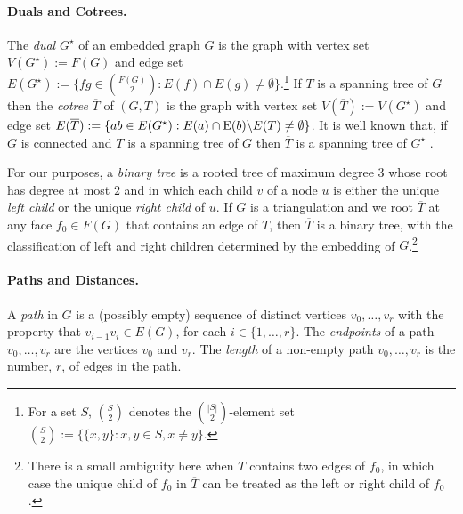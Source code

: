 \documentclass{patmorin}
\DeclareMathOperator{\dist}{dist}
\begin{document}
\paragraph*{Duals and Cotrees.}

The \emph{dual} $G^\star$ of an embedded graph $G$ is the graph with vertex set $V(G^\star):=F(G)$ and edge set $E(G^{\star}):=\{fg\in \binom{F(G)}{2}:E(f)\cap E(g)\neq\emptyset\}$.\footnote{For a set $S$, $\binom{S}{2}$ denotes the $\binom{|S|}{2}$-element set $\binom{S}{2}:=\{\{x,y\}:x,y\in S, x\neq y\}$.} If $T$ is a spanning tree of $G$ then the \emph{cotree} $\overline{T}$ of $(G,T)$ is the graph with vertex set $V(\overline{T}) := V(G^\star)$ and edge set $E(\overline{T}) := \{ab \in E(G^\star) : E(a) \cap \mathrm{E}(b) \backslash E(T) \neq \emptyset \}$. It is well known that, if $G$ is connected and $T$ is a spanning tree of $G$ then $\overline{T}$ is a spanning tree of $G^\star$ \cite[Chapter~4, Exercise~42]{diestel:graph}.

For our purposes, a \emph{binary tree} is a rooted tree of maximum degree $3$ whose root has degree at most $2$ and in which each child $v$ of a node $u$ is either the unique \emph{left child} or the unique \emph{right child} of $u$.  If $G$ is a triangulation  and we root $\overline{T}$ at any face $f_0\in F(G)$ that contains an edge of $T$, then $\overline{T}$ is a binary tree, with the classification of left and right children determined by the embedding of $G$.\footnote{There is a small ambiguity here when $T$ contains two edges of $f_0$, in which case the unique child of $f_0$ in $\overline{T}$ can be treated as the left or right child of $f_0$.}

\paragraph*{Paths and Distances.}

A \emph{path} in $G$ is a (possibly empty) sequence of distinct vertices $v_0,\ldots,v_r$ with the property that $v_{i-1}v_i\in E(G)$, for each $i\in\{1,\ldots,r\}$.  The \emph{endpoints} of a path $v_0,\ldots,v_r$ are the vertices $v_0$ and $v_r$.
The \emph{length} of a non-empty path $v_0,\ldots,v_r$ is the number, $r$, of edges in the path.
%
\end{document}
